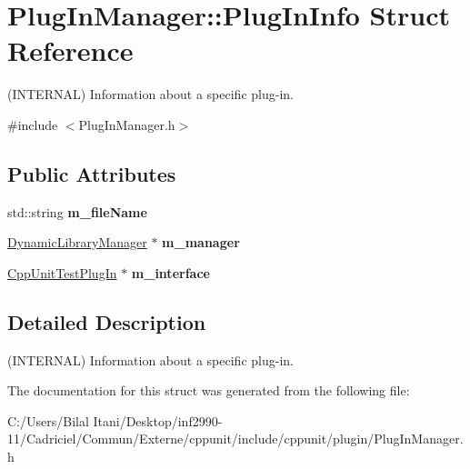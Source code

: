 \hypertarget{struct_plug_in_manager_1_1_plug_in_info}{}\section{Plug\+In\+Manager\+:\+:Plug\+In\+Info Struct Reference}
\label{struct_plug_in_manager_1_1_plug_in_info}


(I\+N\+T\+E\+R\+N\+AL) Information about a specific plug-\/in.  




{\ttfamily \#include $<$Plug\+In\+Manager.\+h$>$}

\subsection*{Public Attributes}
\begin{DoxyCompactItemize}
\item 
std\+::string {\bfseries m\+\_\+file\+Name}\hypertarget{struct_plug_in_manager_1_1_plug_in_info_ac084e2efe4d9953812eff03966c06988}{}\label{struct_plug_in_manager_1_1_plug_in_info_ac084e2efe4d9953812eff03966c06988}

\item 
\hyperlink{class_dynamic_library_manager}{Dynamic\+Library\+Manager} $\ast$ {\bfseries m\+\_\+manager}\hypertarget{struct_plug_in_manager_1_1_plug_in_info_a1889712db485e16a29c45ecba4780f0a}{}\label{struct_plug_in_manager_1_1_plug_in_info_a1889712db485e16a29c45ecba4780f0a}

\item 
\hyperlink{struct_cpp_unit_test_plug_in}{Cpp\+Unit\+Test\+Plug\+In} $\ast$ {\bfseries m\+\_\+interface}\hypertarget{struct_plug_in_manager_1_1_plug_in_info_a306eb58a5d6881b117d6bb9a9ae46589}{}\label{struct_plug_in_manager_1_1_plug_in_info_a306eb58a5d6881b117d6bb9a9ae46589}

\end{DoxyCompactItemize}


\subsection{Detailed Description}
(I\+N\+T\+E\+R\+N\+AL) Information about a specific plug-\/in. 

The documentation for this struct was generated from the following file\+:\begin{DoxyCompactItemize}
\item 
C\+:/\+Users/\+Bilal Itani/\+Desktop/inf2990-\/11/\+Cadriciel/\+Commun/\+Externe/cppunit/include/cppunit/plugin/Plug\+In\+Manager.\+h\end{DoxyCompactItemize}

